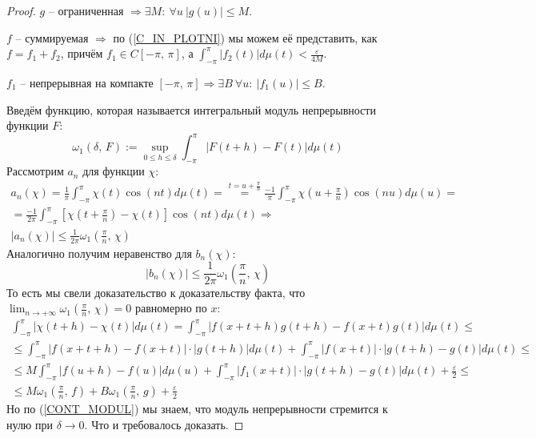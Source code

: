 \documentclass[a4paper,12pt]{article}
\renewcommand{\leq}{\ensuremath{\leqslant}}
\theoremstyle{plain}
\theoremstyle{definition}
\theoremstyle{remark}
\begin{document}
\begin{proof}
	$g$ -- ограниченная $\Rightarrow \exists M:\: \forall u \: |g(u)| \leq M$.

	$f$ -- суммируемая $\Rightarrow$ по (\ref{C_IN_PLOTNI}) мы можем её представить, как $f = f_1 + f_2$, причём $f_1 \in C[-\pi,\,\pi]$, а $\int_{-\pi}^{\pi} |f_2(t)|d\mu(t) < \frac{\varepsilon}{4M}$.

	$f_1$ -- непрерывная на компакте $[-\pi,\,\pi] \Rightarrow \exists B \: \forall u:\: |f_1(u)| \leq B$.

	Введём функцию, которая называется интегральный модуль непрерывности функции $F$:
	\[\omega_1(\delta,\,F) := \sup_{0 \leq h \leq \delta} \int_{-\pi}^\pi |F(t + h) - F(t)|d\mu(t)\]
	Рассмотрим $a_n$ для функции $\chi$:
	\begin{align*}
		a_n(\chi) = \frac{1}{\pi} \int_{-\pi}^\pi \chi(t)\cos(nt)d\mu(t) = \stackrel{t = u + \frac{\pi}{n}}{=} \frac{-1}{\pi}\int_{-\pi}^\pi \chi\left(u + \frac{\pi}{n}\right)\cos(nu)d\mu(u) = \\
		= \frac{-1}{2\pi}\int_{-\pi}^\pi \left[\chi\left(t + \frac{\pi}{n}\right) - \chi(t)\right]\cos(nt)d\mu(t) \Rightarrow                                                                    \\
		|a_n(\chi)| \leq \frac{1}{2\pi}\omega_1\left(\frac{\pi}{n},\, \chi\right)
	\end{align*}
	Аналогично получим неравенство для $b_n(\chi)$:
	\[|b_n(\chi)| \leq \frac{1}{2\pi}\omega_1\left(\frac{\pi}{n},\,\chi\right)\]
	То есть мы свели доказательство к доказательству факта, что $\lim_{n \to +\infty}\omega_1(\frac{\pi}{n},\,\chi) = 0$ равномерно по $x$:
	\begin{align*}
		\int_{-\pi}^\pi |\chi(t + h) - \chi(t)|d\mu(t) = \int_{-\pi}^\pi |f(x + t + h)g(t + h) - f(x + t)g(t)|d\mu(t) \leq                        \\
		\leq \int_{-\pi}^\pi |f(x + t + h) - f(x + t)|\cdot |g (t + h)|d\mu(t) + \int_{-\pi}^\pi |f(x + t)|\cdot |g(t + h) - g(t)|d\mu(t) \leq    \\
		\leq M \int_{-\pi}^\pi |f(u + h) - f(u)|d\mu(u) +  \int_{-\pi}^\pi |f_1(x + t)|\cdot|g(t + h) - g(t)|d\mu(t) + \frac{\varepsilon}{2} \leq \\
		\leq M \omega_1(\frac{\pi}{n},\, f) + B\omega_1(\frac{\pi}{n},\,g) + \frac{\varepsilon}{2}
	\end{align*}
	Но по (\ref{CONT_MODUL}) мы знаем, что модуль непрерывности стремится к нулю при $\delta \to 0$. Что и требовалось доказать.
\end{proof}
\end{document}
